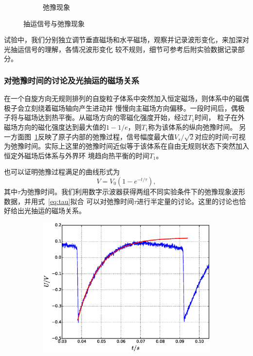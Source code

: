 \documentclass[11pt,a4paper]{article}
\begin{document}
\begin{spacing}{1.3}
\begin{CJK*}{UTF8}{gbsn}
\begin{figure}[h!]
\begin{subfigure}{0.50\textwidth}
\caption{弛豫现象}
\label{fig:fangb}
\end{subfigure}
\caption{抽运信号与弛豫现象}\label{fig:fang}
\end{figure}
试验中，我们分别独立调节垂直磁场和水平磁场，观察并记录波形变化，来加深对光抽运信号的理解，各情况波形变化
较不规则，细节可参考后附实验数据记录部分。\par 
\subsubsection{对弛豫时间的讨论及光抽运的磁场关系}
在一个自旋方向无规则排列的自旋粒子体系中突然加入恒定磁场，则体系中的磁偶极子会立刻绕着磁场轴向产生进动并
慢慢向主磁场方向偏移。一段时间后，偶极子将与磁场达到热平衡。从磁场方向的零磁化强度开始，经过$T_1$时间，
粒子在外磁场方向的磁化强度达到最大值的$1-1/e$，则$T_1$称为该体系的纵向弛豫时间。
另一方面图~\ref{fig:fangb}反映了原子内部的弛豫过程，信号幅度最大值$V_s/\sqrt{2}$对应的时间$\tau$可视
为弛豫时间。实际上这里的弛豫时间近似等于该体系在自由无规则状态下突然加入恒定外磁场后体系与外界环
境趋向热平衡的时间$T_1$。\par 
也可以证明弛豫过程满足的曲线形式为
\begin{equation}
V=V_0(1-e^{-t/\tau}),\label{eq:tau}
\end{equation}
其中$\tau$为弛豫时间。我们利用数字示波器获得两组不同实验条件下的弛豫现象波形数据，并用式~\eqref{eq:tau}拟合
可以对弛豫时间$\tau$进行半定量的讨论。这里的讨论也恰好给出光抽运的磁场关系。\par 
\begin{figure}[h!]
\begin{subfigure}{0.50\textwidth}
\includegraphics[width=\linewidth]{1112b} 

\end{subfigure}
\end{figure}
\end{CJK*}
\end{spacing}
\end{document}
